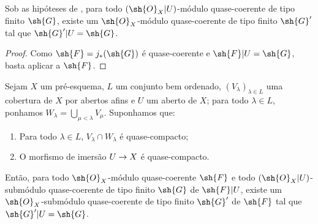 \documentclass[oneside]{amsart}
\makeatletter
\newcommand{\ega@arrow}[2]{\mathchoice{#1}{#2}{#2}{#2}}
\renewcommand{\to}{\ega@arrow{\longrightarrow}{\rightarrow}}
\let\EGAOriginalLabel\label
\renewcommand{\label}[1]{\phantomsection\EGAOriginalLabel{#1}}
\makeatother
\begin{document}
\begin{corollary}[9.4.5]
\label{I.9.4.5}
Sob as hipóteses de , para todo $(\sh{O}_X|U)$-módulo quase-coerente
de tipo finito $\sh{G}$, existe um $\sh{O}_X$-módulo quase-coerente de tipo finito
$\sh{G}'$ tal que $\sh{G}'|U=\sh{G}$.
\end{corollary}

\begin{proof}
Como $\sh{F}=j_*(\sh{G})$ é quase-coerente  e
$\sh{F}|U=\sh{G}$, basta aplicar  a $\sh{F}$.
\end{proof}

\begin{lemma}[9.4.6]
\label{I.9.4.6}
Sejam $X$ um pré-esquema, $L$ um conjunto bem ordenado,
$(V_\lambda)_{\lambda\in L}$ uma cobertura de $X$ por abertos afins e $U$ um aberto
de $X$; para todo $\lambda\in L$, ponhamos
$W_\lambda=\bigcup_{\mu<\lambda}V_\mu$. Suponhamos que:
\begin{enumerate}
  \item[1\textsuperscript{o}] Para todo $\lambda\in L$,
    $V_\lambda\cap W_\lambda$ é quase-compacto;
  \item[2\textsuperscript{o}] O morfismo de imersão $U\to X$ é quase-compacto.
\end{enumerate}
Então, para todo $\sh{O}_X$-módulo quase-coerente $\sh{F}$ e todo
$(\sh{O}_X|U)$-submódulo quase-coerente de tipo finito $\sh{G}$ de $\sh{F}|U$, existe
um $\sh{O}_X$-submódulo quase-coerente de tipo finito $\sh{G}'$ de $\sh{F}$ tal que
$\sh{G}'|U=\sh{G}$.
\end{lemma}
\end{document}
